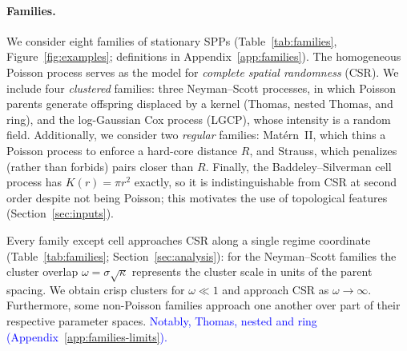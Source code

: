 \documentclass[twoside]{article}
\newcommand{\review}[1]{\textcolor{blue}{#1}}
\begin{document}
\paragraph{Families.}
\label{sec:families}
We consider eight families of stationary SPPs (Table~\ref{tab:families}, Figure~\ref{fig:examples}; definitions in Appendix~\ref{app:families}). The homogeneous Poisson process serves as the model for \emph{complete spatial randomness} (CSR). We include four \emph{clustered} families: three Neyman--Scott processes, in which Poisson parents generate offspring displaced by a kernel (Thomas, nested Thomas, and ring), and the log-Gaussian Cox process (LGCP), whose intensity is a random field. Additionally, we consider two \emph{regular} families: Mat\'ern~II, which thins a Poisson process to enforce a hard-core distance $R$, and Strauss, which penalizes (rather than forbids) pairs closer than $R$. Finally, the Baddeley--Silverman cell process has $K(r)=\pi r^2$ exactly, so it is indistinguishable from CSR at second order despite not being Poisson; this motivates the use of topological features (Section~\ref{sec:inputs}).

Every family except cell approaches CSR along a single regime coordinate (Table~\ref{tab:families}; Section~\ref{sec:analysis}): for the Neyman--Scott families the cluster overlap $\omega=\sigma\sqrt\kappa$ represents the cluster scale in units of the parent spacing. We obtain crisp clusters for $\omega\ll1$ and approach CSR as $\omega\to\infty$. Furthermore, some non-Poisson families approach one another over part of their respective parameter spaces. \review{Notably, Thomas, nested and ring (Appendix~\ref{app:families-limits}).}
\end{document}
